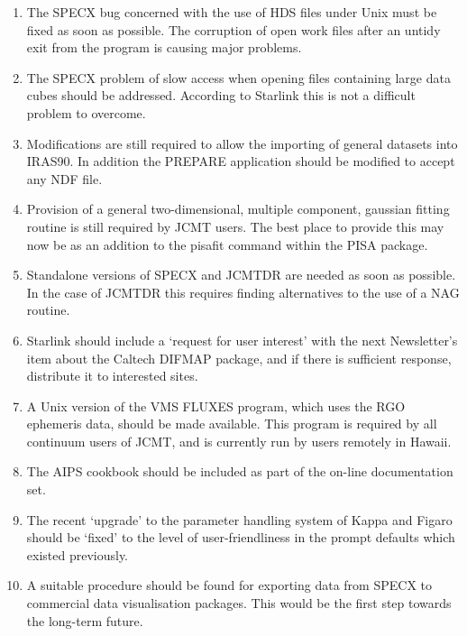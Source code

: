 \begin{enumerate}
\item The SPECX bug concerned with the use of HDS files under Unix must be
fixed as soon as possible. The corruption of open work files after an
untidy exit from the program is causing major problems.

\item The SPECX problem of slow access when opening files containing large
data cubes should be addressed. According to Starlink this is not a
difficult problem to overcome.

\item Modifications are still required to allow the importing of
general datasets into IRAS90. In addition the PREPARE application
should be modified to accept any NDF file.

\item Provision of a general two-dimensional, multiple component,
gaussian fitting routine is still required by JCMT users. The best
place to provide this may now be as an addition to the pisafit command
within the PISA package.

\item Standalone versions of SPECX and JCMTDR are needed as soon
as possible. In the case of JCMTDR this requires finding alternatives
to the use of a NAG routine.

\item Starlink should include a `request for user interest' with the
next Newsletter's item about the Caltech DIFMAP package, and if there
is sufficient response, distribute it to interested sites.

\item A Unix version of the VMS FLUXES program, which uses the RGO
ephemeris data, should be made available. This program is required by
all continuum users of JCMT, and is currently run by users remotely in
Hawaii.

\item The AIPS cookbook should be included as part of the on-line
documentation set.

\item The recent `upgrade' to the parameter handling system of Kappa and
Figaro should be `fixed' to the level of user-friendliness in the
prompt defaults which existed previously.

\item A suitable procedure should be found for exporting data from
SPECX to commercial data visualisation packages. This would be the
first step towards the long-term future.


\end{enumerate}
